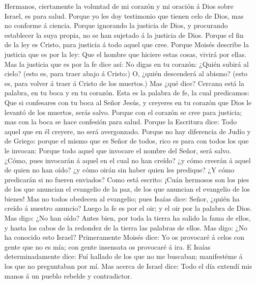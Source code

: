  Hermanos, ciertamente la voluntad de mi corazón y mi
oración á Dios sobre Israel, es para salud.  Porque yo les
doy testimonio que tienen celo de Dios, mas no conforme á ciencia.
 Porque ignorando la justicia de Dios, y procurando
establecer la suya propia, no se han sujetado á la justicia de Dios.
 Porque el fin de la ley es Cristo, para justicia á todo
aquel que cree.  Porque Moisés describe la justicia que es
por la ley: Que el hombre que hiciere estas cosas, vivirá por ellas.
 Mas la justicia que es por la fe dice así: No digas en tu
corazón: ¿Quién subirá al cielo? (esto es, para traer abajo á Cristo:)
 O, ¿quién descenderá al abismo? (esto es, para volver á
traer á Cristo de los muertos.)  Mas ¿qué dice? Cercana está
la palabra, en tu boca y en tu corazón. Esta es la palabra de fe, la
cual predicamos:  Que si confesares con tu boca al Señor
Jesús, y creyeres en tu corazón que Dios le levantó de los muertos,
serás salvo.  Porque con el corazón se cree para justicia;
mas con la boca se hace confesión para salud.  Porque la
Escritura dice: Todo aquel que en él creyere, no será avergonzado.
 Porque no hay diferencia de Judío y de Griego: porque el
mismo que es Señor de todos, rico es para con todos los que le invocan:
 Porque todo aquel que invocare el nombre del Señor, será
salvo.  ¿Cómo, pues invocarán á aquel en el cual no han
creído? ¿y cómo creerán á aquel de quien no han oído? ¿y cómo oirán sin
haber quien les predique?  ¿Y cómo predicarán si no fueren
enviados? Como está escrito: ¡Cuán hermosos son los pies de los que
anuncian el evangelio de la paz, de los que anuncian el evangelio de los
bienes!  Mas no todos obedecen al evangelio; pues Isaías
dice: Señor, ¿quién ha creído á nuestro anuncio?  Luego la
fe es por el oir; y el oir por la palabra de Dios.  Mas
digo: ¿No han oído? Antes bien, por toda la tierra ha salido la fama de
ellos, y hasta los cabos de la redondez de la tierra las palabras de
ellos.  Mas digo: ¿No ha conocido esto Israel? Primeramente
Moisés dice: Yo os provocaré á celos con gente que no es mía; con gente
insensata os provocaré á ira.  E Isaías determinadamente
dice: Fuí hallado de los que no me buscaban; manifestéme á los que no
preguntaban por mí.  Mas acerca de Israel dice: Todo el día
extendí mis manos á un pueblo rebelde y contradictor.


